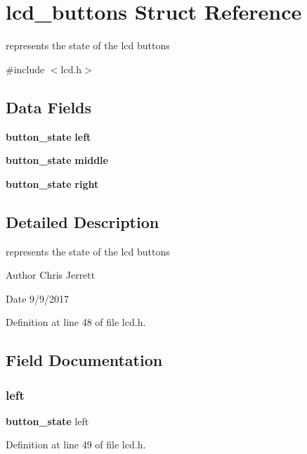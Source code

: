 \section{lcd\+\_\+buttons Struct Reference}
\label{structlcd__buttons}


represents the state of the lcd buttons  




{\ttfamily \#include $<$lcd.\+h$>$}

\subsection*{Data Fields}
\begin{DoxyCompactItemize}
\item 
\textbf{ button\+\_\+state} \textbf{ left}
\item 
\textbf{ button\+\_\+state} \textbf{ middle}
\item 
\textbf{ button\+\_\+state} \textbf{ right}
\end{DoxyCompactItemize}


\subsection{Detailed Description}
represents the state of the lcd buttons 

\begin{DoxyAuthor}{Author}
Chris Jerrett 
\end{DoxyAuthor}
\begin{DoxyDate}{Date}
9/9/2017 
\end{DoxyDate}


Definition at line 48 of file lcd.\+h.



\subsection{Field Documentation}
\mbox{\label{structlcd__buttons_adf4426df10903d1dba0ee269473cb079}} 
\subsubsection{left}
{\footnotesize\ttfamily \textbf{ button\+\_\+state} left}



Definition at line 49 of file lcd.\+h.

